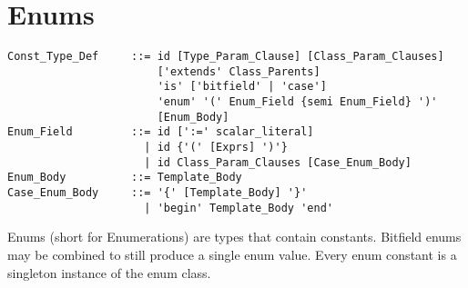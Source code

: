 \section{Enums}
\label{sec:enums}

\syntax\begin{lstlisting}
Const_Type_Def     ::= id [Type_Param_Clause] [Class_Param_Clauses]
                       ['extends' Class_Parents] 
                       'is' ['bitfield' | 'case'] 
                       'enum' '(' Enum_Field {semi Enum_Field} ')'
                       [Enum_Body]
Enum_Field         ::= id [':=' scalar_literal]
                     | id {'(' [Exprs] ')'}
                     | id Class_Param_Clauses [Case_Enum_Body]
Enum_Body          ::= Template_Body
Case_Enum_Body     ::= '{' [Template_Body] '}'
                     | 'begin' Template_Body 'end'
\end{lstlisting}

Enums (short for Enumerations) are types that contain constants. Bitfield enums may be combined to still produce a single enum value. Every enum constant is a singleton instance of the enum class. 

